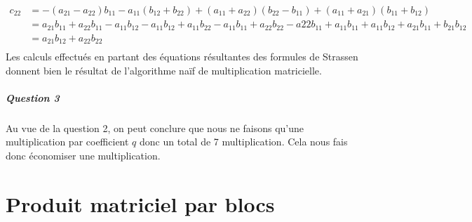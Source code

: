 \documentclass[a4paper,10pt,margin=2in]{report}
\begin{document}
\bigskip
\begin{align*}
c_{22} &= -(a_{21} - a_{22})b_{11} - a_{11}(b_{12} + b_{22}) + (a_{11} + a_{22})(b_{22} - b_{11}) + (a_{11} + a_{21})(b_{11} + b_{12})\\
&= a_{21}b_{11} + a_{22}b_{11} - a_{11}b_{12} - a_{11}b_{12} + a_{11}b_{22} - a_{11}b_{11} + a_{22}b_{22} - a{22}b_{11} + a_{11}b_{11} + a_{11}b_{12} + a_{21}b_{11} + b_{21}b_{12}\\
&= a_{21}b_{12} + a_{22}b_{22}\\
\end{align*}
Les calculs effectués en partant des équations résultantes des formules de Strassen donnent bien le résultat de l'algorithme naïf de multiplication matricielle.

\paragraph{Question 3}
Au vue de la question 2, on peut conclure que nous ne faisons qu'une multiplication par coefficient $q$ donc un total de 7 multiplication. Cela nous fais donc économiser une multiplication. 

\chapter{Produit matriciel par blocs}
\end{document}
